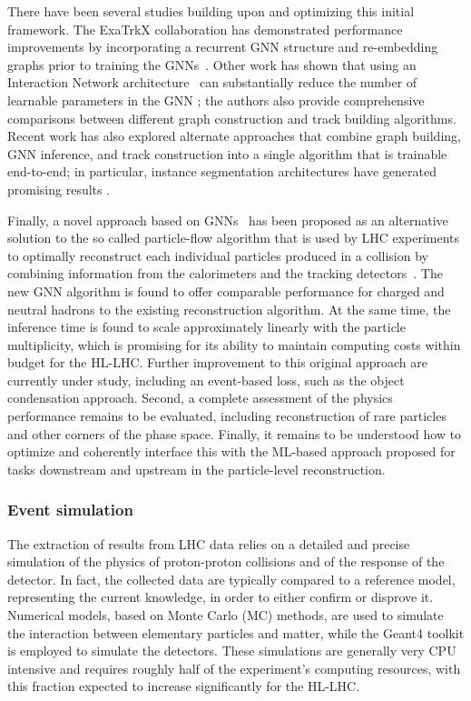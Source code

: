 There have been several studies building upon and optimizing this initial framework. The ExaTrkX collaboration has demonstrated performance improvements by incorporating a recurrent GNN structure \cite{exatrk_19} and re-embedding graphs prior to training the GNNs~\cite{embedding}. Other work has shown that using an Interaction Network architecture~\cite{battaglia2016interaction} can substantially reduce the number of learnable parameters in the GNN \cite{dezoort2021charged}; the authors also provide comprehensive comparisons between different graph construction and track building algorithms. Recent work has also explored alternate approaches that combine graph building, GNN inference, and track construction into a single algorithm that is trainable end-to-end; in particular, instance segmentation architectures have generated promising results \cite{thais2021instance}.

Finally, a novel approach based on GNNs~\cite{Pata:2021oez} has been proposed as an alternative solution to the so called particle-flow algorithm that is used by LHC experiments to optimally reconstruct each individual particles produced in a collision by combining information from the calorimeters and the tracking detectors~\cite{Sirunyan:2017ulk}. The new GNN algorithm is found to offer comparable performance for charged and neutral hadrons to the existing reconstruction algorithm. At the same time, the inference time is found to scale approximately linearly with the particle multiplicity, which is promising for its ability to maintain computing costs within budget for the HL-LHC. Further improvement to this original approach are currently under study, including an event-based loss, such as the object condensation approach. Second, a complete assessment of the physics performance remains to be evaluated,  including reconstruction of rare particles and other corners of the phase space. Finally, it remains to be understood how to optimize and coherently interface this with the ML-based approach proposed for tasks downstream and upstream in the particle-level reconstruction.

\subsubsection{Event simulation}
\label{sec:lhceventsim}

The extraction of results from LHC data relies on a detailed and precise simulation of the physics of proton-proton collisions and of the response of the detector. In fact, the collected data are typically compared to a reference model, representing the current knowledge, in order to either confirm or disprove it. Numerical models, based on Monte Carlo (MC) methods, are used to simulate the interaction between elementary particles and matter, while the Geant4 toolkit is employed to simulate the detectors. These simulations are generally very CPU intensive and requires roughly half of the experiment’s computing resources, with this fraction expected to increase significantly for the HL-LHC. 

